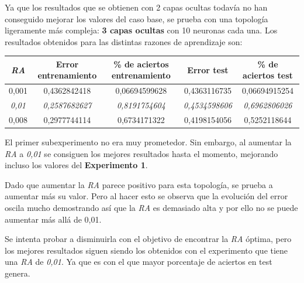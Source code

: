 \documentclass{uc3mpracticas}
\begin{document}
Ya que los resultados que se obtienen con 2 capas ocultas todavía no han conseguido mejorar los valores del caso base, se prueba con una topología ligeramente más compleja: \textbf{3 capas ocultas} con 10 neuronas cada una. Los resultados obtenidos para las distintas razones de aprendizaje son:

\begin{center}
  \begin{tabular}{|c|c|c|c|c|}
    \hline
    \rowcolor{Gray}
        \textit{\textbf{RA}}  & \textbf{Error entrenamiento} & \textbf{\% de aciertos entrenamiento} & \textbf{Error test} & \textbf{\% de aciertos test}\\ \hline
        0,001                 &  0,4362842418                &  0,06694599628                        &  0,4363116735       &  0,06694915254              \\ \hline
        \rowcolor{LightGreen}
        \textit{0,01}         &  \textit{0,2587682627}       &  \textit{0,8191754604}                &  \textit{0,4534598606}&  \textit{0,6962806026}    \\ \hline
        0,008                 &  0,2977744114                &  0,6734171322                         &  0,4198154056       &  0,5252118644               \\ \hline

  \end{tabular}
\end{center}

El primer subexperimento no era muy prometedor. Sin embargo, al aumentar la \textit{RA} a \textit{0,01} se consiguen los mejores resultados hasta el momento, mejorando incluso los valores del \textbf{Experimento 1}.

\vspace{2mm}

Dado que aumentar la \textit{RA} parece positivo para esta topología, se prueba a aumentar más su valor. Pero al hacer esto se observa que la evolución del error oscila mucho demostrando así que la \textit{RA} es demasiado alta y por ello no se puede aumentar más allá de 0,01.

\vspace{2mm}

Se intenta probar a disminuirla con el objetivo de encontrar la \textit{RA} óptima, pero los mejores resultados siguen siendo los obtenidos con el experimento que tiene una \textit{RA} de \textit{0,01}. Ya que es con el que mayor porcentaje de aciertos en test genera.
\end{document}

